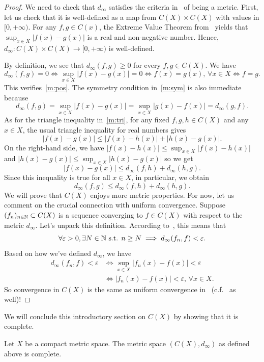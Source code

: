 \begin{proof}
	We need to check that $d_\infty$ satisfies the criteria in~ of being a metric. First, let us check that it is well-defined as a map from $C(X)\times C(X)$ with values in $[0,+\infty)$. For any $f,g \in C(x)$, the Extreme Value Theorem from~ yields that $\sup_{x\in X}|f(x) - g(x)|$ is a real and non-negative number. Hence, $d_\infty :C(X)\times C(X)\to [0,+\infty)$ is well-defined.
	
	By definition, we see that $d_\infty(f,g)\ge 0$ for every $f,g\in C(X)$. We have
	\[
	d_\infty(f,g) = 0 \iff \sup_{x\in X}|f(x) - g(x)| = 0 \iff f(x) = g(x),\, \forall x \in X \iff f = g.
	\]
	This verifies~\ref{m:pos}. The symmetry condition in~\ref{m:sym} is also immediate because
	\[
	d_\infty(f,g) = \sup_{x\in X}|f(x) - g(x)| = \sup_{x\in X}|g(x) - f(x)| = d_\infty(g,f).
	\]
	As for the triangle inequality in~\ref{m:tri}, for any fixed $f,g,h\in C(X)$ and any $x\in X$, the usual triangle inequality for real numbers gives
	\[
	|f(x) - g(x)| \le |f(x) - h(x)| + |h(x) - g(x)|.
	\]
	On the right-hand side, we have $|f(x) - h(x)| \le \sup_{x\in X}|f(x) - h(x)|$ and $|h(x) - g(x)| \le \sup_{x\in X}|h(x) - g(x)|$ so we get
	\[
	|f(x) - g(x)| \le d_\infty(f,h) + d_\infty (h,g).
	\]
	Since this inequality is true for all $x\in X$, in particular, we obtain
	\[
	d_\infty(f,g) \le d_\infty(f,h) + d_\infty(h,g).
	\]
	We will prove that $C(X)$ enjoys more metric properties. For now, let us comment on the crucial connection with uniform convergence. Suppose $(f_n)_{n\in\mathbb{N}}\subset C(X)$ is a sequence converging to $f \in C(X)$ with respect to the metric $d_\infty$. Let's unpack this definition. According to~, this means that
	\[
	\forall \varepsilon>0,\exists N\in\mathbb{N}\text{ s.t. }n\ge N \implies d_\infty(f_n,f)<\varepsilon.
	\]
	Based on how we've defined $d_\infty$, we have
	\begin{align*}
		d_\infty(f_n,f)<\varepsilon &\iff \sup_{x\in X}|f_n(x) - f(x)|<\varepsilon 	\\
		&\iff |f_n(x) - f(x)|<\varepsilon,\,\forall x\in X.
	\end{align*}
	So convergence in $C(X)$ is the same as uniform convergence in~ (c.f.~ as well)!
\end{proof}
We will conclude this introductory section on $C(X)$ by showing that it is complete.
\begin{prop}[$C(X)$ is complete]
	\label{prop:C^0_complete}
	Let $X$ be a compact metric space. The metric space $(C(X),d_\infty)$ as defined above is complete.
\end{prop}
